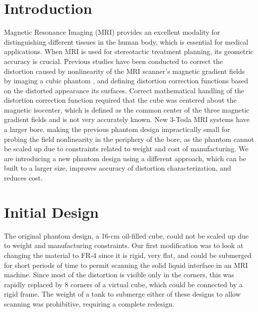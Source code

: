 \section{Introduction}

Magnetic Resonance Imaging (MRI) provides an excellent modality for distinguishing different tissues in the
human body, which is essential for medical applications. When MRI is used for stereotactic treatment planning,
its geometric accuracy is crucial. Previous studies have been conducted to correct the distortion caused by
nonlinearity of the MRI scanner’s magnetic gradient fields by imaging a cubic phantom \cite{simple_approach},
\cite{tlee_iaeng} and defining
distortion correction functions based on the distorted appearance its surfaces. Correct mathematical handling
of the distortion correction function required that the cube was centered about the magnetic isocenter, which
is defined as the common center of the three magnetic gradient fields and  is not very accurately known.
New 3-Tesla MRI systems have a larger bore, making the previous phantom design impractically small for probing
the field nonlinearity in the periphery of the bore, as the phantom cannot be scaled up due to constraints
related to weight and cost of manufacturing. We are introducing a new phantom design using a different
approach, which can be built to a larger size, improves accuracy of distortion characterization, and reduces
cost.

\section{Initial Design}

The original phantom design, a 16-cm oil-filled cube, could not be scaled up due to weight and manufacturing
constraints. Our first modification was to look at changing the material to FR-4 since it is rigid, very flat,
and could be submerged for short periods of time to permit scanning the solid liquid interface in an MRI
machine.  Since most of the distortion is visible only in the corners, this was rapidly replaced by 8 corners
of a virtual cube, which could be connected by a rigid frame.  The weight of a tank to submerge either of
these designs to allow scanning was prohibitive, requiring a complete redesign.

